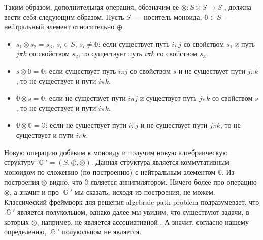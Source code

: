 Таким образом, дополнительная операция, обозначим её $\otimes: S \times S \to S$%
%
, должна вести себя следующим образом. Пусть $S$~--- носитель моноида, $\Bbbzero \in S$~--- нейтральный элемент относительно $\oplus$.
\begin{itemize}
    \label{itm:otimesIntro}
    \item $s_1 \otimes s_2 = s_3$, $s_i \in S$, $s_i \neq \Bbbzero$: если существует путь $i \pi j$ со свойством $s_1$ и путь $j \pi k$ со свойством $s_2$, то существует путь $i \pi k$ со свойством $s_3$.
    \item $s \otimes \Bbbzero = \Bbbzero$: если существует путь $i \pi j$ со свойством $s$ и не существует пути $j \pi k$, то не существует и пути $i \pi k$.
    \item $\Bbbzero \otimes s = \Bbbzero$: если не существует пути $i \pi j$ и существует путь $j \pi k$ со свойством $s$, то не существует и пути $i \pi k$.
    \item $\Bbbzero \otimes \Bbbzero = \Bbbzero$: если не существует пути $i \pi j$ и не существует пути $j \pi k$, то не существует и пути $i \pi k$.
\end{itemize}

Новую операцию добавим к моноиду и получим новую алгебраическую структуру $\BbbG' = (S, \oplus,\otimes)$.
Данная структура является коммутативным моноидом по сложению (по построению) с нейтральным элементом $\Bbbzero$.
Из построения $\otimes$ видно, что $\Bbbzero$ является аннигилятором.
Ничего более про операцию $\otimes$, а значит и про $\BbbG'$ мы сказать, исходя из построения, не можем.
Классический фреймворк для решения algebraic path problem подразумевает, что $\BbbG'$ является полукольцом, однако далее мы увидим, что существуют задачи, в которых $\otimes$, например, не является ассоциативной%
.
А значит, согласно нашему определению, $\BbbG'$ полукольцом не является.

